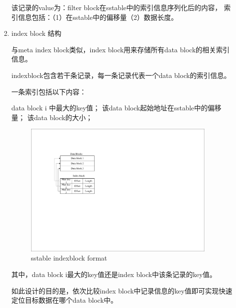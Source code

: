 \begin{enumerate}
\begin{enumerate}
该记录的value为：filter block在sstable中的索引信息序列化后的内容，
索引信息包括：（1）在sstable中的偏移量（2）数据长度。

	\item index block 结构
	
	与meta index block类似，index block用来存储所有data block的相关索引信息。

indexblock包含若干条记录，每一条记录代表一个data block的索引信息。

一条索引包括以下内容：

data block i 中最大的key值；
该data block起始地址在sstable中的偏移量；
该data block的大小；
\begin{figure}[H]
	\centering
	\includegraphics[width=0.95\textwidth]{pdf/indexblock_format.pdf}
	\caption{sstable indexblock format}
	\label{sstable_indexblock_format}
\end{figure}

其中，data block i最大的key值还是index block中该条记录的key值。

如此设计的目的是，依次比较index block中记录信息的key值即可实现快速定位目标数据在哪个data block中。


\end{enumerate}
\end{enumerate}
